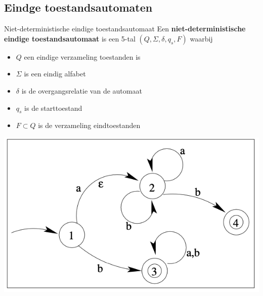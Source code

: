 \subsection{Eindge toestandsautomaten}

\vspace{0.5cm}

\begin{theo}{Niet-deterministische eindige toestandsautomaat}
    Een \textbf{niet-deterministische eindige toestandsautomaat} is een 5-tal $(Q,\Sigma, \delta, q_s, F)$ waarbij

    \vspace{0.5cm}

    \begin{minipage}{.56\textwidth}
        \begin{itemize}
            \item $Q$ een eindige verzameling toestanden is
            \item $\Sigma$ is een eindig alfabet
            \item $\delta$ is de overgangsrelatie van de automaat
            \item $q_s$ is de starttoestand
            \item $F \subset Q$ is de verzameling eindtoestanden
        \end{itemize}
    \end{minipage}
    \begin{minipage}{.4\textwidth}
        \begin{center}
            \includegraphics[scale = 0.25]{Images/NFA}
        \end{center}
    \end{minipage}
\end{theo}


